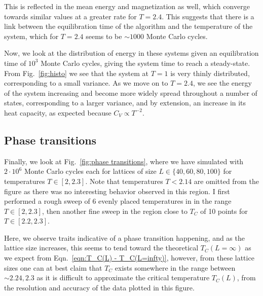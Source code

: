 \documentclass[10pt,showpacs,preprintnumbers,amsmath,amssymb,nofootinbib,aps,prl,twocolumn,groupedaddress,superscriptaddress,showkeys]{revtex4-1}
\begin{document}
  This is reflected in the mean energy and magnetization as well, which converge towards similar values at a greater rate for $T=2.4$. This suggests that there is a link between the equilibration time of the algorithm and the temperature of the system, which for $T=2.4$ seems to be $\sim 1000$ Monte Carlo cycles.

  Now, we look at the distribution of energy in these systems given an equilibration time of $10^3$ Monte Carlo cycles, giving the system time to reach a steady-state. From Fig.~\ref{fig:histo} we see that the system at $T=1$ is very thinly distributed, corresponding to a small variance. As we move on to $T=2.4$, we see the energy of the system increasing and become more widely spread throughout a number of states, corresponding to a larger variance, and by extension, an increase in its heat capacity, as expected because $C_V \propto T^{-2}$.

  \subsection{Phase transitions}

  Finally, we look at Fig.~\ref{fig:phase transitions}, where we have simulated with $2\cdot10^6$ Monte Carlo cycles each for lattices of size $L \in \{40, 60, 80, 100\}$ for temperatures $T\in[2, 2.3]$. Note that temperatures $T<2.14$ are omitted from the figure as there was no interesting behavior observed in this region.
  I first performed a rough sweep of $6$ evenly placed temperatures in in the range $T \in[2, 2.3]$, then another fine sweep in the region close to $T_C$ of 10 points for $T\in[2.2, 2.3]$.

  Here, we observe traits indicative of a phase transition happening, and as the lattice size increases, this seems to tend toward the theoretical $T_C(L=\infty)$ as we expect from Eqn.~\ref{eqn:T_C(L) - T_C(L=infty)}, however, from these lattice sizes one can at best claim that $T_C$ exists somewhere in the range between $\sim 2.24, 2.3$ as it is difficult to approximate the critical temperature $T_C(L)$, from the resolution and accuracy of the data plotted in this figure.
\end{document}
